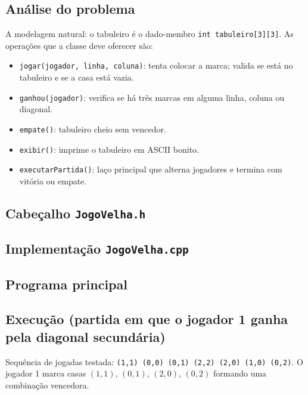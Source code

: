 \documentclass[11pt,a4paper]{article}
\begin{document}
\subsection*{An\'alise do problema}

A modelagem natural: o tabuleiro \'e o dado-membro \texttt{int tabuleiro[3][3]}. As opera\c{c}\~oes que a classe deve oferecer s\~ao:

\begin{itemize}[leftmargin=*,itemsep=0pt]
  \item \texttt{jogar(jogador, linha, coluna)}: tenta colocar a marca; valida se est\'a no tabuleiro e se a casa est\'a vazia.
  \item \texttt{ganhou(jogador)}: verifica se h\'a tr\^es marcas em alguma linha, coluna ou diagonal.
  \item \texttt{empate()}: tabuleiro cheio sem vencedor.
  \item \texttt{exibir()}: imprime o tabuleiro em ASCII bonito.
  \item \texttt{executarPartida()}: la\c{c}o principal que alterna jogadores e termina com vit\'oria ou empate.
\end{itemize}

\subsection*{Cabe\c{c}alho \texttt{JogoVelha.h}}



\subsection*{Implementa\c{c}\~ao \texttt{JogoVelha.cpp}}



\subsection*{Programa principal}



\subsection*{Execu\c{c}\~ao (partida em que o jogador 1 ganha pela diagonal secund\'aria)}

Sequ\^encia de jogadas testada: \texttt{(1,1) (0,0) (0,1) (2,2) (2,0) (1,0) (0,2)}. O jogador 1 marca casas $(1,1)$, $(0,1)$, $(2,0)$, $(0,2)$ formando uma combina\c{c}\~ao vencedora.
\end{document}
